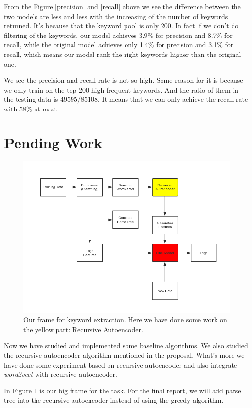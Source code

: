 \documentclass[dvips,9pt]{article}
\begin{document}
        From the Figure \ref{precision} and \ref{recall} above we see the difference between the two models are less and less with the increasing of the number of keywords returned. It's because that the keyword pool is only 200. In fact if we don't do filtering of the keywords, our model achieves 3.9\% for precision and 8.7\% for recall, while the original model achieves only 1.4\% for precision and 3.1\% for recall, which means our model rank the right keywords higher than the original one.
        
        We see the precision and recall rate is not so high. Some reason for it is because we only train on the top-200 high frequent keywords. And the ratio of them in the testing data is 49595/85108. It means that we can only achieve the recall rate with 58\% at most.
	\section{Pending Work}
    \begin{figure}
        \includegraphics[scale=0.6]{DataFlow.png}
        \caption{Our frame for keyword extraction. Here we have done some work on the yellow part: Recursive Autoencoder.}
        \label{frame}
    \end{figure}
    Now we have studied and implemented some baseline algorithms. We also studied the recursive autoencoder algorithm mentioned in the proposal. What's more we have done some experiment based on recursive autoencoder and also integrate \emph{word2vect} with recursive autoencoder.
    
    In Figure \ref{frame} is our big frame for the task. For the final report, we will add parse tree into the recursive autoencoder instead of using the greedy algorithm.
    
\end{document}
